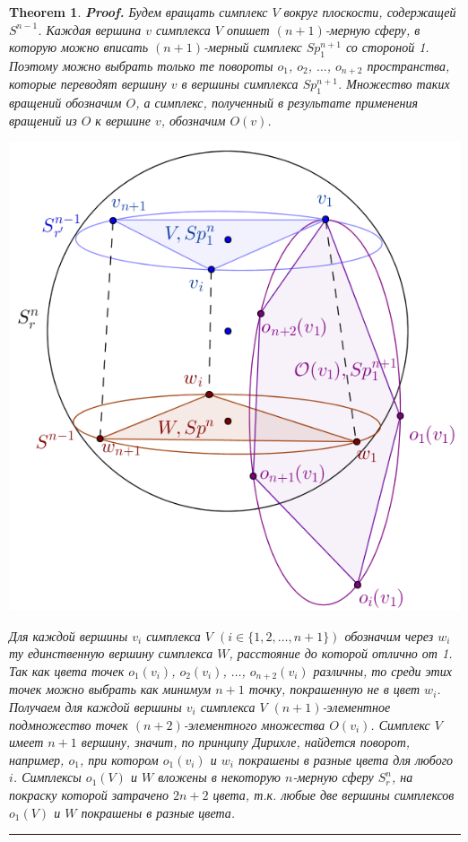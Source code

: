 \documentclass{report}%
\newtheorem{theorem}{Theorem}
\newenvironment{proof}[1][Proof]{\textbf{#1.} }{\ \rule{0.5em}{0.5em}}
\begin{document}
\begin{theorem}
\begin{proof}
				Будем вращать симплекс $V$ вокруг плоскости, содержащей $S^{n-1}$.
				Каждая вершина $v$ симплекса $V$ опишет $(n+1)$-мерную сферу,
				в которую можно вписать $(n+1)$-мерный симплекс $Sp_1^{n+1}$ со стороной 1.
				Поэтому можно выбрать только те повороты $o_1$, $o_2$, $\ldots$, $o_{n+2}$ пространства,
				которые переводят вершину $v$ в вершины симплекса $Sp_1^{n+1}$.
				Множество таких вращений обозначим $O$, а симплекс, полученный в результате применения вращений из $O$ к вершине $v$, обозначим $O(v)$. \\
				\begin{center}
						\includegraphics[scale = 1]{sphere}
				\end{center}
				
				Для каждой вершины $v_i$ симплекса $V$ $( i \in \{1, 2, \ldots, n+1\})$ обозначим через $w_i$ ту единственную вершину симплекса $W$,
				расстояние до которой отлично от 1. Так как цвета точек $o_1(v_i)$, $o_2(v_i)$, $\ldots$, $o_{n+2}(v_i)$ различны,
				то среди этих точек можно выбрать как минимум $n+1$ точку, покрашенную не в цвет $w_i$.
				Получаем для каждой вершины $v_i$ симплекса $V$ $(n+1)$-элементное подмножество точек $(n+2)$-элементного множества $O(v_i)$.
				Симплекс $V$ имеет $n+1$ вершину, значит, по принципу Дирихле, найдется поворот, например, $o_1$,
				при котором $o_1(v_i)$ и $w_i$ покрашены в разные цвета для любого $i$.
				Симплексы $o_1(V)$ и $W$ вложены в некоторую $n$-мерную сферу $S_r^n$, на покраску которой затрачено $2n+2$ цвета,
				т.к. любые две вершины симплексов $o_1(V)$ и $W$ покрашены в разные цвета. 
		\end{proof}
\end{theorem}
\end{document}
